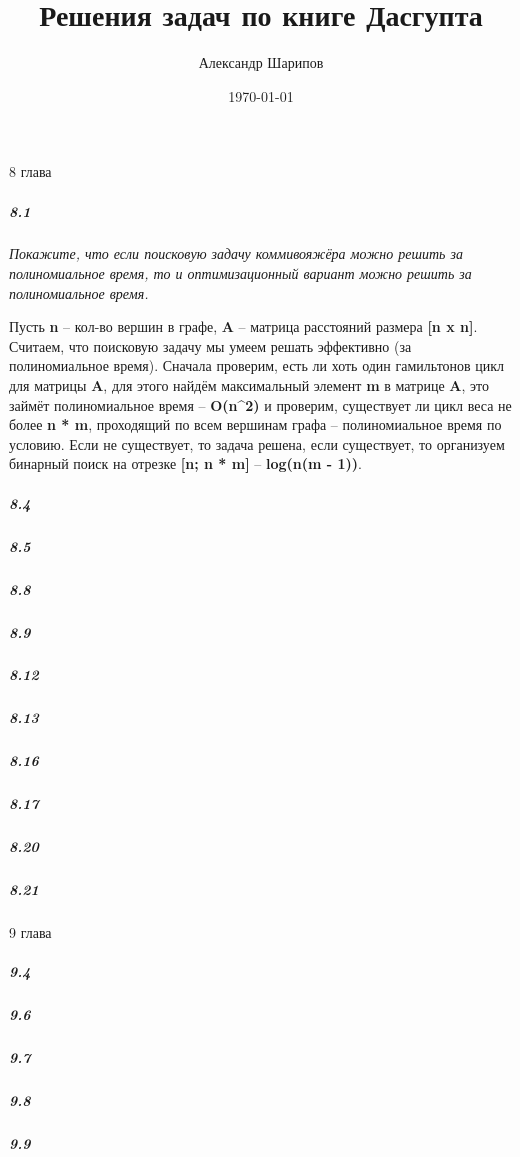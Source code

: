 \documentclass{article}
\title{Решения задач по книге Дасгупта}
\author{Александр Шарипов}
\date{\today}
\begin{document}
\maketitle
\newpage
{}

8 глава

\subparagraph{8.1} \textit{Покажите, что если поисковую задачу коммивояжёра можно решить за полиномиальное время, то и оптимизационный вариант можно решить за полиномиальное время.}

Пусть \textbf{n} -- кол-во вершин в графе, \textbf{A} -- матрица расстояний размера \textbf{[n x n]}. Считаем, что поисковую задачу мы умеем решать эффективно (за полиномиальное время). Сначала проверим, есть ли хоть один гамильтонов цикл для матрицы \textbf{A}, для этого найдём максимальный элемент \textbf{m} в матрице \textbf{A}, это займёт полиномиальное время -- \textbf{O(n^2)} и проверим, существует ли цикл веса не более \textbf{n * m}, проходящий по всем вершинам графа -- полиномиальное время по условию. Если не существует, то задача решена, если существует, то организуем бинарный поиск на отрезке \textbf{[n; n * m]} -- \textbf{log(n(m - 1))}.

\subparagraph{8.4} 



\subparagraph{8.5}

\subparagraph{8.8}

\subparagraph{8.9}

\subparagraph{8.12}

\subparagraph{8.13}

\subparagraph{8.16}

\subparagraph{8.17}

\subparagraph{8.20}

\subparagraph{8.21}

9 глава

\subparagraph{9.4}

\subparagraph{9.6}

\subparagraph{9.7}

\subparagraph{9.8}

\subparagraph{9.9}
\end{document}
